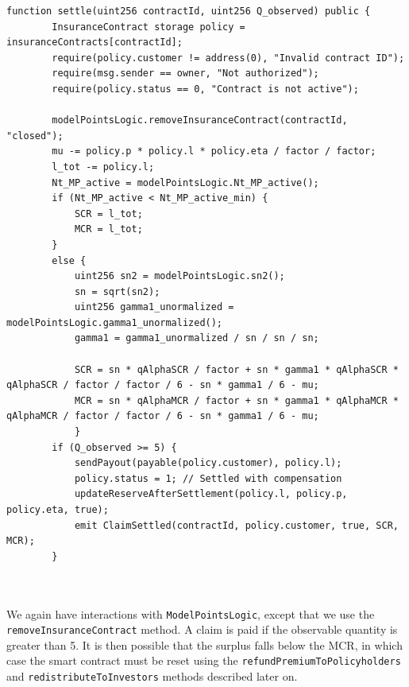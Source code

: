 \documentclass[10pt]{article}
\begin{document}
\begin{codefragment}[!h]
\begin{lstlisting}[language=Solidity]
function settle(uint256 contractId, uint256 Q_observed) public {
        InsuranceContract storage policy = insuranceContracts[contractId];
        require(policy.customer != address(0), "Invalid contract ID");
        require(msg.sender == owner, "Not authorized");
        require(policy.status == 0, "Contract is not active");
        
        modelPointsLogic.removeInsuranceContract(contractId, "closed");
        mu -= policy.p * policy.l * policy.eta / factor / factor;
        l_tot -= policy.l;
        Nt_MP_active = modelPointsLogic.Nt_MP_active();
        if (Nt_MP_active < Nt_MP_active_min) {
            SCR = l_tot;
            MCR = l_tot;
        }
        else {
            uint256 sn2 = modelPointsLogic.sn2();
            sn = sqrt(sn2);
            uint256 gamma1_unormalized = modelPointsLogic.gamma1_unormalized();
            gamma1 = gamma1_unormalized / sn / sn / sn;
            
            SCR = sn * qAlphaSCR / factor + sn * gamma1 * qAlphaSCR * qAlphaSCR / factor / factor / 6 - sn * gamma1 / 6 - mu;
            MCR = sn * qAlphaMCR / factor + sn * gamma1 * qAlphaMCR * qAlphaMCR / factor / factor / 6 - sn * gamma1 / 6 - mu;
            }
        if (Q_observed >= 5) {
            sendPayout(payable(policy.customer), policy.l);
            policy.status = 1; // Settled with compensation
            updateReserveAfterSettlement(policy.l, policy.p, policy.eta, true);
            emit ClaimSettled(contractId, policy.customer, true, SCR, MCR);
        } 

        

        \end{lstlisting}
\caption{Part 1 of \texttt{settle} method of \texttt{InsuranceLogic}}
    \label{code:settle_method_1}
\end{codefragment}

We again have interactions with \texttt{ModelPointsLogic}, except that we use the \texttt{removeInsuranceContract} method. A claim is paid if the observable quantity is greater than 5. It is then possible that the surplus falls below the MCR, in which case the smart contract must be reset using the \texttt{refundPremiumToPolicyholders} and \texttt{redistributeToInvestors} methods described later on.
 
\end{document}
